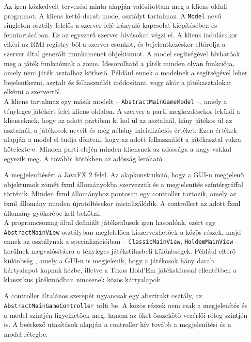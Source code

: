 Az igen közkedvelt tervezési minta alapján valósítottam meg a kliens oldali programot.
A kliens kettő darab model osztályt tartalmaz. A \texttt{Model} nevű singleton osztály felelős a szerver felé irányuló kapcsolat kiépítésében és fenntartásában. Ez az egyszerű szerver hívásokat végzi el. A kliens indulásakor elkéri az RMI registry-ből a szerver csonkot, és bejelentkezéskor eltárolja a szerver által generált munkamenet objektumot. A model segítségével hívhatóak meg a játék funkcióinak a zöme. Idesorolható a játék minden olyan funkciója, amely nem játék asztalhoz köthető. Például ennek a modelnek a segítségével lehet bejelentkezni, asztalt és felhasználót módosítani, vagy akár a játékasztalokat elkérni a szervertől. \\
A kliens tartalmaz egy másik modelt -- \texttt{AbstractMainGameModel} --, amely a tényleges játékért felel kliens oldalon. A szerver a parti megkezdésekor leküldi a klienseknek, hogy az adott partiban ki hol ül az asztalnál, hány játékos ül az asztalnál, a játékosok neveit és még néhány inicializációs értéket. Ezen értékek alapján a model el tudja dönteni, hogy az adott felhasználót a játékasztal vakra kötelezte-e. Minden parti elején minden kliensnek az adóssága a nagy vakkal egyezik meg. A további körökben az adósság leróható.

A megjelenítésért a JavaFX 2 \cite{javafx} felel. Az alapkonstrukció, hogy a GUI-n megjelenő objektumok zömét fxml állományokba szervezzük és a megjelenítés színtérgráffal történik. Minden fxml állományhoz pontosan egy controller tartozik, amely az fxml állomány minden újratöltésekor inicializálódik. A controllert az adott fxml állomány gyökerébe kell bekötni. \\
A programcsomag által definiált játékstílusok igen hasonlóak, ezért egy \texttt{AbstractMainView} osztályban megfelelően kiszervezhetőek a közös részek, majd ennek az osztálynak a specializációiban -- \texttt{ClassicMainView}, \texttt{HoldemMainView} -- kerülnek megvalósításra a tényleges játékstílusbeli különbségek. Például eltérő különbség , amely a GUI-n is megjelenik, hogy a játékosok hány darab kártyalapot kapnak kézbe, illetve a Texas Hold'Em játékstílussal ellentétben a klasszikus játékmódban nincsenek közös kártyalapok.

A controller általános szerepét ugyancsak egy absztrakt osztály, az \texttt{AbstractMainGameController} tölti be. A közös részek nem csak a megjelenítés és a model szintjén figyelhetőek meg, hanem az őket összekötő vezérlői réteg szintjén is. A beérkező utasítások alapján a controller hív tovább a megjelenítési és a model rétegbe.

